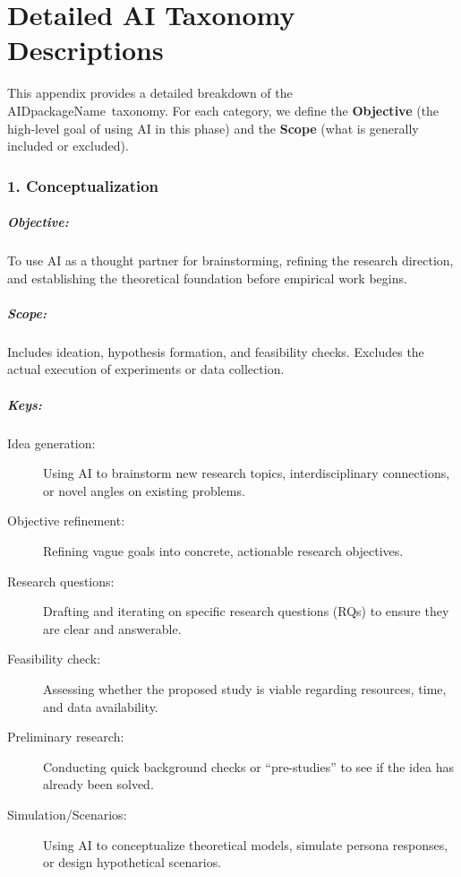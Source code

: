 
\chapter{Detailed \gls{AI} Taxonomy Descriptions}
\label{app:taxonomy}

This appendix provides a detailed breakdown of the \\AIDpackageName\ taxonomy.
For each category, we define the \textbf{Objective} (the high-level goal of using \gls{AI} in this phase) and the \textbf{Scope} (what is generally included or excluded).

\begingroup
\setparaheadstyle{\normalfont\normalsize\bfseries\color{blue!80!black}}

\subsection*{1. Conceptualization}
\paragraph{Objective:} To use \gls{AI} as a thought partner for brainstorming, refining the research direction, and establishing the theoretical foundation before empirical work begins.
\paragraph{Scope:} Includes ideation, hypothesis formation, and feasibility checks. Excludes the actual execution of experiments or data collection.
\paragraph{Keys:}
\begin{description}
    \item[Idea generation:] Using \gls{AI} to brainstorm new research topics, interdisciplinary connections, or novel angles on existing problems.
    \item[Objective refinement:] Refining vague goals into concrete, actionable research objectives.
    \item[Research questions:] Drafting and iterating on specific research questions (RQs) to ensure they are clear and answerable.
    \item[Feasibility check:] Assessing whether the proposed study is viable regarding resources, time, and data availability.
    \item[Preliminary research:] Conducting quick background checks or “pre-studies” to see if the idea has already been solved.
    \item[Simulation/Scenarios:] Using \gls{AI} to conceptualize theoretical models, simulate persona responses, or design hypothetical scenarios.
\end{description}

